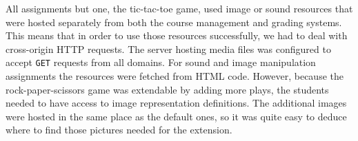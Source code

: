 All assignments but one, the tic-tac-toe game, used image or sound resources that were hosted separately from both the course management and grading systems. This means that in order to use those resources successfully, we had to deal with cross-origin HTTP requests. The server hosting media files was configured to accept \texttt{GET} requests from all domains. For sound and image manipulation assignments the resources were fetched from HTML code. However, because the rock-paper-scissors game was extendable by adding more plays, the students needed to have access to image representation definitions. The additional images were hosted in the same place as the default ones, so it was quite easy to deduce where to find those pictures needed for the extension.
